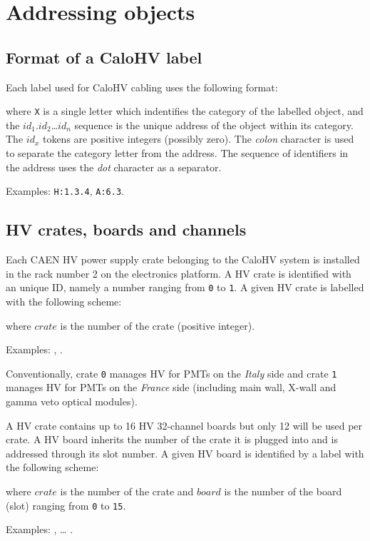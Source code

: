 
\section{Addressing objects}

\subsection{Format of a CaloHV label}

Each label used for CaloHV cabling uses the following format:

\begin{center}
\end{center}
\noindent  where \texttt{X}  is a single letter  which indentifies  the
category  of the  labelled  object,  and the  $id_1$.$id_2$\dots$id_n$
sequence is the unique address of the object within its category.  The
$id_x$ tokens are positive integers (possibly zero).  The \emph{colon}
character is  used to separate  the category letter from  the address.
The  sequence  of  identifiers  in  the  address  uses  the  \emph{dot}
character as a separator.

\vskip 10pt Examples: \texttt{H:1.3.4}, \texttt{A:6.3}.


\subsection{HV crates, boards and channels}

Each CAEN  HV power  supply crate  belonging to  the CaloHV  system is
installed in  the rack  number 2  on the  electronics platform.   A HV
crate is  identified with an unique  ID, namely a number  ranging from
\texttt{0}  to \texttt{1}.   A given  HV  crate is  labelled with  the
following scheme:
\begin{center}
 \end{center}
where \texttt{$crate$} is the number of the crate (positive integer).
\vskip     10pt    \par\noindent     Examples:    ,
.  \par Conventionally, crate \texttt{0} manages HV
for PMTs on the \emph{Italy} side  and crate \texttt{1} manages HV for
PMTs on the \emph{France} side  (including main wall, X-wall and gamma
veto optical modules).

\vskip 10pt A HV crate contains up to 16 HV 32-channel boards but only
12 will  be used  per crate.  A  HV board inherits  the number  of the
crate it is plugged into and  is addressed through its slot number.  A
given HV board is identified by a label with the following scheme:
\begin{center}
 \end{center}
where \texttt{$crate$} is the number of the crate and \texttt{$board$}
is  the  number  of  the  board  (slot)  ranging  from  \texttt{0}  to
\texttt{15}.
\vskip 10pt
\par\noindent Examples: ,  \dots
{}.

